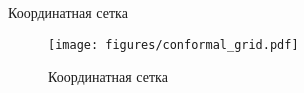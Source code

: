 \begin{frame}{Координатная сетка}
	\begin{figure}
		\centering
		\texttt{[image: figures/conformal\_grid.pdf]}
		\caption{Координатная сетка}\label{fig:conformal_grid}
	\end{figure}
\end{frame}
